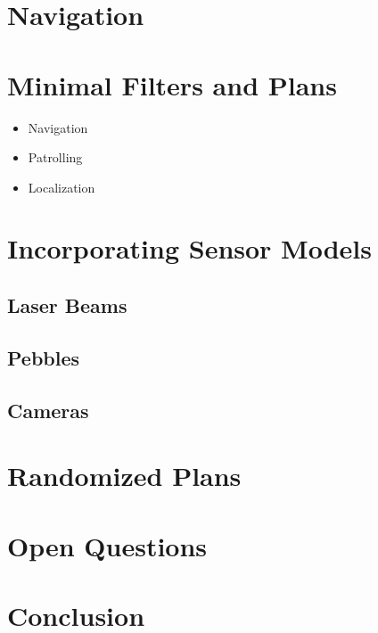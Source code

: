 \documentclass[letterpaper, 10 pt, conference]{ieeeconf}  %
\begin{document}
\section{Navigation}

\section{Minimal Filters and Plans}

\begin{itemize}
\item Navigation
\item Patrolling
\item Localization
\end{itemize}

\section{Incorporating Sensor Models}

\subsection{Laser Beams}

\subsection{Pebbles}

\subsection{Cameras}

\section{Randomized Plans}

\section{Open Questions}

\section{Conclusion}
\end{document}
